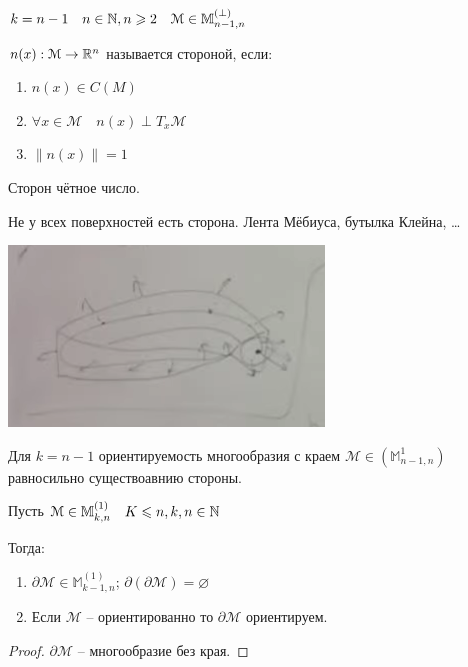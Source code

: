 \begin{definition}
    $k = n-1\quad n\in \mathbb{N} , n\geqslant 2\quad \mathcal M \in \mathbb M_{n-1, n}^{(\perp)}$

    $n(x) : \mathcal M \to \mathbb{R}^n$ называется стороной, если:
    \begin{enumerate}
        \item $n(x)\in C(M)$
        \item $\forall x\in \mathcal M\quad n(x)\perp T_x \mathcal M$
        \item $\|n(x)\| = 1$
    \end{enumerate}
\end{definition}

\begin{note}
    Сторон чётное число.
\end{note}

\begin{note}
    Не у всех поверхностей есть сторона. Лента Мёбиуса, бутылка Клейна, \ldots

    \begin{center}
        \includegraphics[scale=0.5]{img/moebius-tape.png}
    \end{center}
\end{note}

\begin{statement}
    Для $k = n-1$ ориентируемость многообразия с краем $\mathcal M \in (\mathbb M_{n-1, n}^1)$ равносильно существоавнию стороны.
\end{statement}

\begin{theorem}
    Пусть $\mathcal M\in \mathbb M^{(1)}_{k, n}\quad K\leqslant n, k, n\in \mathbb{N} $

    Тогда:
    \begin{enumerate}
        \item $\partial \mathcal {M} \in \mathbb{M}_{k-1 ,n}^{(1)}$; $\partial \left(\partial \mathcal{M}\right) = \varnothing $
        \item Если $\mathcal M$ -- ориентированно то $\partial \mathcal M$ ориентируем.
    \end{enumerate}
\end{theorem}
\begin{proof}
    $\partial \mathcal M$ -- многообразие без края.
\end{proof}

